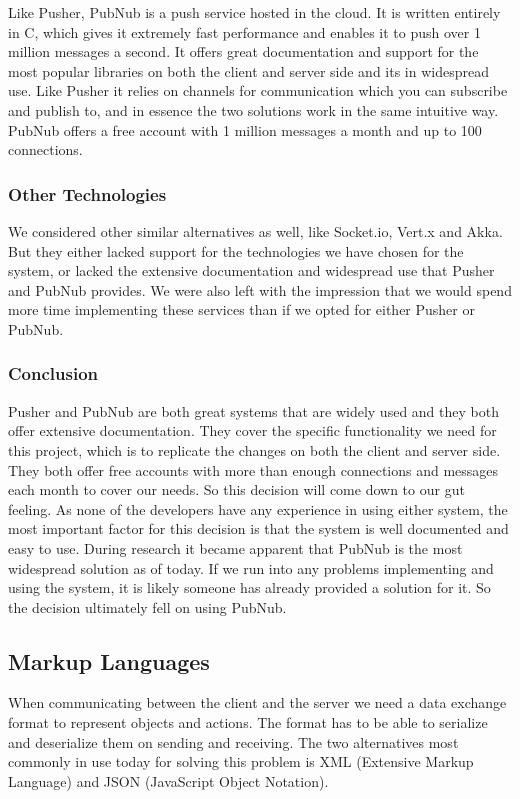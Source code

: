 Like Pusher, PubNub is a push service hosted in the cloud. It is written entirely in C, which gives it extremely fast performance and enables it to push over 1 million messages a second. It offers great documentation and support for the most popular libraries on both the client and server side and its in widespread use. Like Pusher it relies on channels for communication which you can subscribe and publish to, and in essence the two solutions work in the same intuitive way. PubNub offers a free account with 1 million messages a month and up to 100 connections.

\subsubsection{Other Technologies}
We considered other similar alternatives as well, like Socket.io, Vert.x and Akka. But they either lacked support for the technologies we have chosen for the system, or lacked the extensive documentation and widespread use that Pusher and PubNub provides. We were also left with the impression that we would spend more time implementing these services than if we opted for either Pusher or PubNub.

\subsubsection{Conclusion}
Pusher and PubNub are both great systems that are widely used and they both offer extensive documentation. They cover the specific functionality we need for this project, which is to replicate the changes on both the client and server side. They both offer free accounts with more than enough connections and messages each month to cover our needs. So this decision will come down to our gut feeling. As none of the developers have any experience in using either system, the most important factor for this decision is that the system is well documented and easy to use. During research it became apparent that PubNub is the most widespread solution as of today. If we run into any problems implementing and using the system, it is likely someone has already provided a solution for it. So the decision ultimately fell on using PubNub.


\subsection{Markup Languages}
When communicating between the client and the server we need a data exchange format to represent objects and actions. The format has to be able to serialize and deserialize them on sending and receiving. The two alternatives most commonly in use today for solving this problem is XML (Extensive Markup Language) and JSON (JavaScript Object Notation).


